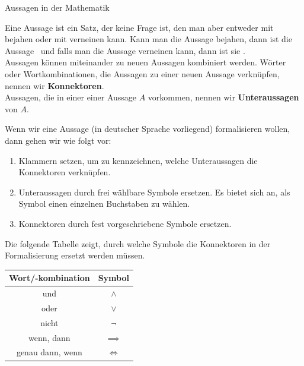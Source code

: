 \documentclass[../../main.tex]{subfiles}
\begin{document}
\begin{nutshell}{Aussagen in der Mathematik}

    Eine Aussage ist ein Satz, der keine Frage ist, den man aber entweder mit 
     bejahen oder mit  
    verneinen kann. Kann man die Aussage bejahen, dann ist die Aussage \wahr\ und falls man
    die Aussage verneinen kann, dann ist sie \falsch . 
    \[\]
   Aussagen können miteinander zu neuen Aussagen kombiniert werden. Wörter oder Wortkombinationen, die Aussagen zu einer neuen Aussage verknüpfen, nennen wir \textbf{Konnektoren}.
    \[\]
   Aussagen, die in einer einer Aussage $A$ vorkommen, nennen wir \textbf{Unteraussagen} von $A$.\bigskip
   
   Wenn wir eine Aussage (in deutscher Sprache vorliegend) formalisieren wollen, dann gehen wir wie folgt vor:
   \begin{enumerate}
       \item Klammern setzen, um zu kennzeichnen, welche Unteraussagen die Konnektoren verknüpfen.
       \item Unteraussagen durch frei wählbare Symbole ersetzen. Es bietet sich an, als Symbol einen einzelnen Buchstaben zu wählen.
       \item Konnektoren durch fest vorgeschriebene Symbole ersetzen.
   \end{enumerate}
   
    Die folgende Tabelle zeigt, durch welche Symbole die Konnektoren in der Formalisierung ersetzt werden müssen.
    
   \begin{center}
       \begin{tabular}{cc}\toprule
            Wort/-kombination & Symbol\\\midrule
            und &  $\land$\\
            oder&  $\lor$\\
            nicht & $\lnot$\\
            wenn, dann& $\implies$\\
            genau dann, wenn&  $\iff$\\\bottomrule
        \end{tabular}
    \end{center}
\end{nutshell}
    
\end{document}
